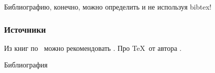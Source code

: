 Библиографию, конечно, можно определить и не используя bibtex!

\begin{frame}
    \frametitle{Источники}
    
    Из книг по \LaTeXe\ можно рекомендовать \cite{bib:cotelnikov,bib:baldin}. Про \TeX\ от автора \cite{bib:knuth:AllAbout}.
\end{frame}


\begin{frame}[allowframebreaks]{Библиография}

    
    
\end{frame}



